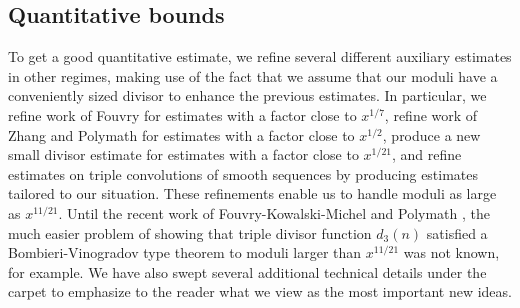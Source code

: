 \documentclass[10pt]{amsart}
\theoremstyle{plain}
\numberwithin{equation}{section}
\begin{document}
\subsection{Quantitative bounds}
%
%
%
%
To get a good quantitative estimate, we refine several different auxiliary estimates in other regimes, making use of the fact that we assume that our moduli have a conveniently sized divisor to enhance the previous estimates. In particular, we refine work of Fouvry \cite{Fouvry} for estimates with a factor close to $x^{1/7}$, refine work of Zhang \cite{Zhang} and Polymath \cite{Polymath} for estimates with a factor close to $x^{1/2}$, produce a new small divisor estimate for estimates with a factor close to $x^{1/21}$, and refine estimates on triple convolutions of smooth sequences by producing estimates tailored to our situation. These refinements enable us to handle moduli as large as $x^{11/21}$. Until the recent work of Fouvry-Kowalski-Michel \cite{FKMDivisor} and Polymath \cite{Polymath}, the much easier problem of showing that triple divisor function $d_3(n)$ satisfied a Bombieri-Vinogradov type theorem to moduli larger than $x^{11/21}$ was not known, for example. We have also swept several additional technical details under the carpet to emphasize to the reader what we view as the most important new ideas.
%
%
%
%
%
%
%
%
%
%
%
%
%
%
%
%
%
%
%
%
\end{document}
